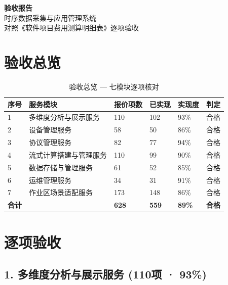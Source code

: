 \documentclass[11pt,a4paper]{ctexart}
\begin{document}
\begin{center}
{\Huge\bfseries\color{pri}验收报告}\\[6pt]
{\large 时序数据采集与应用管理系统}\\[4pt]
{\normalsize 对照《软件项目费用测算明细表》逐项验收 }
\end{center}
\vspace{1em}\hrulefill\vspace{1em}

\section{验收总览}

\begin{table}[H]\centering
\begin{tabular}{p{0.8cm}p{4cm}p{2.5cm}p{2.5cm}p{2.5cm}p{2cm}}
\toprule
\textbf{序号} & \textbf{服务模块} & \textbf{报价项数} & \textbf{已实现} & \textbf{实现度} & \textbf{判定} \\
\midrule
1 & 多维度分析与展示服务 & 110 & 102 & 93\% & \color{ok}合格 \\
2 & 设备管理服务 & 58 & 50 & 86\% & \color{ok}合格 \\
3 & 协议管理服务 & 82 & 77 & 94\% & \color{ok}合格 \\
4 & 流式计算搭建与管理服务 & 110 & 99 & 90\% & \color{ok}合格 \\
5 & 数据存储与管理服务 & 61 & 52 & 85\% & \color{ok}合格 \\
6 & 运维管理服务 & 34 & 31 & 91\% & \color{ok}合格 \\
7 & 作业区场景适配服务 & 173 & 148 & 86\% & \color{ok}合格 \\
\midrule
\textbf{合计} & & \textbf{628} & \textbf{559} & \textbf{89\%} & \color{ok}\textbf{合格} \\
\bottomrule
\end{tabular}
\caption{验收总览 — 七模块逐项核对}
\end{table}

\section{逐项验收}

\subsection{1. 多维度分析与展示服务 (110项 · 93\%)}
\end{document}
